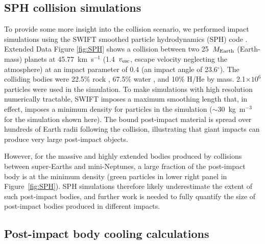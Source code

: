 \documentclass[sn-nature]{sn-jnl}%
\begin{document}
\subsection*{SPH collision simulations}

To provide some more insight into the collision scenario, we performed impact simulations using the SWIFT smoothed particle hydrodynamics (SPH) code \cite{Schaller2016,Schaller2018,Kegerreis2019}.
%
Extended Data Figure \ref{fig:SPH} shows a collision between two 25~$M_{\rm Earth}$ (Earth-mass) planets at 45.77~km~s$^{-1}$ (1.4~$v_{\rm esc}$, escape velocity neglecting the atmosphere) at an impact parameter of 0.4 (an impact angle of 23.6$^\circ$).
%
The colliding bodies were 22.5\% rock \cite[forsterite,][]{Stewart2019forsteriteEOS,Stewart2020_key_req_EOS}, 67.5\% water \cite{Senft2008}, and 10\% H/He \cite{Hubbard1980} by mass.
%
2.1$\times10^6$ particles were used in the simulation.
%
To make simulations with high resolution numerically tractable, SWIFT imposes a maximum smoothing length that, in effect, imposes a minimum density for particles in the simulation ($\sim30$~kg~m$^{-3}$ for the simulation shown here). 
%
The bound post-impact material is spread over hundreds of Earth radii following the collision, illustrating that giant impacts can produce very large post-impact objects. 

However, for the massive and highly extended bodies produced by collisions between super-Earths and mini-Neptunes, a large fraction of the post-impact body is at the minimum density (green particles in lower right panel in Figure~\ref{fig:SPH}).
%
SPH simulations therefore likely underestimate the extent of such post-impact bodies, and further work is needed to fully quantify the size of post-impact bodies produced in different impacts.

\subsection*{Post-impact body cooling calculations}
\end{document}
